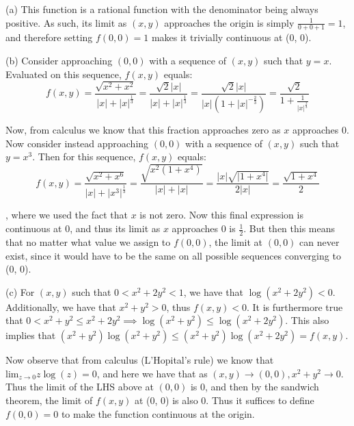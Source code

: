 \begin{solution}

    (a) This function is a rational function with the denominator being always positive. As such, its limit as $(x, y)$ approaches the origin is simply $\frac{1}{0 + 0 + 1} = 1$, and therefore setting $f(0, 0) = 1$ makes it trivially continuous at (0, 0).

    (b) Consider approaching $(0, 0)$ with a sequence of $(x, y)$ such that $y = x$. Evaluated on this sequence, $f(x, y)$ equals:
    $$f(x, y) = \frac{\sqrt{x^2 + x^2}}{\lvert x \rvert + \lvert x \rvert^{\frac{1}{3}}} = \frac{\sqrt{2} \lvert x \rvert}{\lvert x \rvert + \lvert x \rvert^{\frac{1}{3}}} = \frac{\sqrt{2}\lvert x \rvert}{\lvert x \rvert (1 + \lvert x \rvert^{-\frac{2}{3}})} = \frac{\sqrt{2}}{1 + \frac{1}{\lvert x \rvert^\frac{2}{3}}}$$

    Now, from calculus we know that this fraction approaches zero as $x$ approaches 0. Now consider instead approaching $(0, 0)$ with a sequence of $(x, y)$ such that $y = x^3$. Then for this sequence, $f(x, y)$ equals:
    $$f(x, y) = \frac{\sqrt{x^2 + x^6}}{\lvert x \rvert + \lvert x^3 \rvert^{\frac{1}{3}}} = \frac{\sqrt{x^2(1 + x^4)}}{\lvert x \rvert + \lvert x \rvert} = \frac{\lvert x \rvert\sqrt{\lvert 1 + x^4\rvert}}{2\lvert x \rvert} = \frac{\sqrt{1+x^4}}{2}$$
    
    , where we used the fact that $x$ is not zero. Now this final expression is continuous at 0, and thus its limit as $x$ approaches 0 is $\frac{1}{2}$. But then this means that no matter what value we assign to $f(0, 0)$, the limit at $(0, 0)$ can never exist, since it would have to be the same on all possible sequences converging to (0, 0).

    (c) For $(x, y)$ such that $0 < x^2 + 2y^2 < 1$, we have that $\log(x^2 + 2y^2) < 0$. Additionally, we have that $x^2 + y^2 > 0$, thus $f(x, y) < 0$. It is furthermore true that $0 < x^2 + y^2 \leq x^2 + 2y^2 \implies \log(x^2+y^2) \leq \log(x^2 + 2y^2)$. This also implies that $(x^2 + y^2)\log(x^2 + y^2) \leq (x^2 + y^2)\log(x^2 + 2y^2) = f(x, y)$. 
    
    Now observe that from calculus (L'Hopital's rule) we know that $\text{lim}_{z \rightarrow 0} z\log(z) = 0$, and here we have that as $(x, y) \rightarrow (0, 0), x^2 + y^2 \rightarrow 0$. Thus the limit of the LHS above at $(0, 0)$ is 0, and then by the sandwich theorem, the limit of $f(x, y)$ at (0, 0) is also 0. Thus it suffices to define $f(0, 0) = 0$ to make the function continuous at the origin.


\end{solution}
